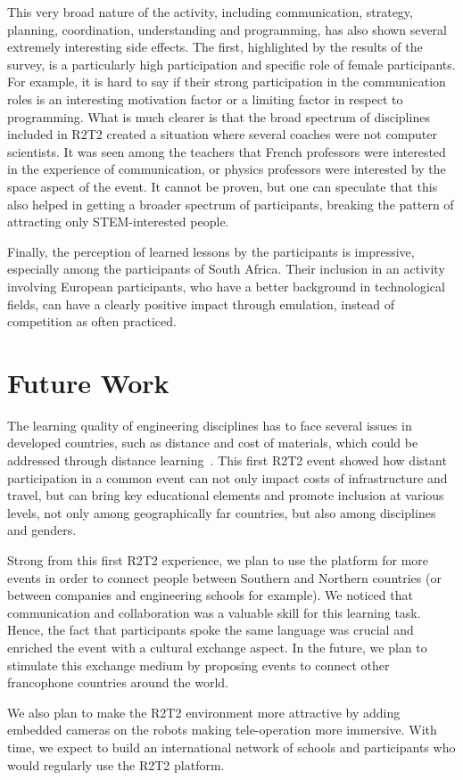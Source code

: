\documentclass{intech-journal}
\begin{document}
This very broad nature of the activity, including communication, strategy, planning, coordination, understanding and programming, has also shown several extremely interesting side effects.
The first, highlighted by the results of the survey, is a particularly high participation and specific role of female participants.
For example, it is hard to say if their strong participation in the communication roles is an interesting motivation factor or a limiting factor in respect to programming. 
What is much clearer is that the broad spectrum of disciplines included in R2T2 created a situation where several coaches were not computer scientists. 
It was seen among the teachers that French professors were interested in the experience of communication, or physics professors were interested by the space aspect of the event. 
It cannot be proven, but one can speculate that this also helped in getting a broader spectrum of participants, breaking the pattern of attracting only STEM-interested people.

Finally, the perception of learned lessons by the participants is impressive, especially among the participants of South Africa.
Their inclusion in an activity involving European participants, who have a better background in technological fields, can have a clearly positive impact through emulation, instead of competition as often practiced. 

\section{Future Work}
The learning quality of engineering disciplines has to face several issues in developed countries, such as distance and cost of materials, which could be addressed through distance learning~\cite{winthrop2012new}. 
This first R2T2 event showed how distant participation in a common event can not only impact costs of infrastructure and travel, but can bring key educational elements and promote inclusion at various levels, not only among geographically far countries, but also among disciplines and genders.

Strong from this first R2T2 experience, we plan to use the platform for more events in order to connect people between Southern and Northern countries (or between companies and engineering schools for example). 
We noticed that communication and collaboration was a valuable skill for this learning task.
Hence, the fact that participants spoke the same language was crucial and enriched the event with a cultural exchange aspect.
In the future, we plan to stimulate this exchange medium by proposing events to connect other francophone countries around the world. 

We also plan to make the R2T2 environment more attractive by adding embedded cameras on the robots making tele-operation more immersive. 
With time, we expect to build an international network of schools and participants who would regularly use the R2T2 platform. 
\small
{}
\end{document}
